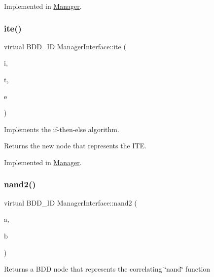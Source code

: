 Implemented in \hyperlink{classManager_af026f76f68823bb9083f161b5db9e58b}{Manager}.

\mbox{\label{classManagerInterface_a099c8fab45923f6a30e4f2c53052e511}} 
\subsubsection{\texorpdfstring{ite()}{ite()}}
{\footnotesize\ttfamily virtual B\+D\+D\+\_\+\+ID Manager\+Interface\+::ite (\begin{DoxyParamCaption}\item[{const B\+D\+D\+\_\+\+ID}]{i,  }\item[{const B\+D\+D\+\_\+\+ID}]{t,  }\item[{const B\+D\+D\+\_\+\+ID}]{e }\end{DoxyParamCaption})\hspace{0.3cm}{\ttfamily [pure virtual]}}

Implements the if-\/then-\/else algorithm. \begin{DoxyReturn}{Returns}
the new node that represents the I\+TE. 
\end{DoxyReturn}


Implemented in \hyperlink{classManager_ab6b8135aadc0a5b91b5c651c4046da05}{Manager}.

\mbox{\label{classManagerInterface_af51e4c180a25f80bdfd99ff7a9931477}} 
\subsubsection{\texorpdfstring{nand2()}{nand2()}}
{\footnotesize\ttfamily virtual B\+D\+D\+\_\+\+ID Manager\+Interface\+::nand2 (\begin{DoxyParamCaption}\item[{const B\+D\+D\+\_\+\+ID}]{a,  }\item[{const B\+D\+D\+\_\+\+ID}]{b }\end{DoxyParamCaption})\hspace{0.3cm}{\ttfamily [pure virtual]}}

\begin{DoxyReturn}{Returns}
a B\+DD node that represents the correlating \char`\"{}nand\char`\"{} function 
\end{DoxyReturn}


